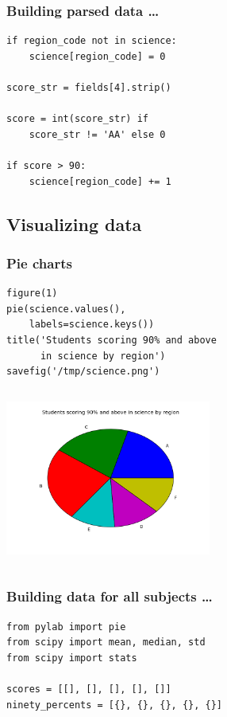 \documentclass[14pt,compress]{beamer}
\newcounter{time}
\newcommand{\inctime}[1]{\addtocounter{time}{#1}{\tiny \thetime\ m}}
\begin{document}
\begin{frame}[fragile]
  \frametitle{Building parsed data \ldots}
  \begin{lstlisting}
if region_code not in science:
    science[region_code] = 0

score_str = fields[4].strip()

score = int(score_str) if
    score_str != 'AA' else 0

if score > 90:
    science[region_code] += 1
  \end{lstlisting}
\end{frame}

\subsection{Visualizing data}
\begin{frame}[fragile]
  \frametitle{Pie charts}
  \small
  \begin{lstlisting}
figure(1)
pie(science.values(), 
    labels=science.keys())
title('Students scoring 90% and above 
      in science by region')
savefig('/tmp/science.png')
  \end{lstlisting}
\begin{columns}
    \hspace*{1.1in}
\includegraphics[height=2in, interpolate=true]{data/science}
\end{columns}
  \inctime{5}
\end{frame}

\begin{frame}[fragile]
  \frametitle{Building data for all subjects \ldots}
  \begin{lstlisting}
from pylab import pie
from scipy import mean, median, std
from scipy import stats

scores = [[], [], [], [], []]
ninety_percents = [{}, {}, {}, {}, {}]
  \end{lstlisting}
\end{frame}
\end{document}
